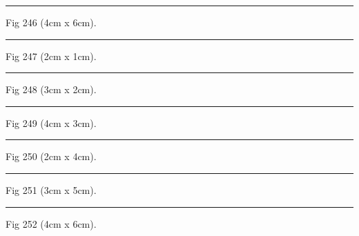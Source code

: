 \documentclass[a4paper,11pt]{article}
\begin{document}
\begin{swarmwrap}%
  \begin{minipage}[t]{4cm}
    \centering
    \rule{\linewidth}{6cm}
    {\footnotesize Fig 246 (4cm x 6cm).}
  \end{minipage}%
\end{swarmwrap}%
\swarmwrapnext
\lipsum[96]%

\begin{swarmwrap}%
  \begin{minipage}[t]{2cm}
    \centering
    \rule{\linewidth}{1cm}
    {\footnotesize Fig 247 (2cm x 1cm).}
  \end{minipage}%
\end{swarmwrap}%
\swarmwrapnext
\lipsum[97]%

\begin{swarmwrap}%
  \begin{minipage}[t]{3cm}
    \centering
    \rule{\linewidth}{2cm}
    {\footnotesize Fig 248 (3cm x 2cm).}
  \end{minipage}%
\end{swarmwrap}%
\swarmwrapnext
\lipsum[98]%

\begin{swarmwrap}%
  \begin{minipage}[t]{4cm}
    \centering
    \rule{\linewidth}{3cm}
    {\footnotesize Fig 249 (4cm x 3cm).}
  \end{minipage}%
\end{swarmwrap}%
\swarmwrapnext
\lipsum[99]%

\begin{swarmwrap}%
  \begin{minipage}[t]{2cm}
    \centering
    \rule{\linewidth}{4cm}
    {\footnotesize Fig 250 (2cm x 4cm).}
  \end{minipage}%
\end{swarmwrap}%
\swarmwrapnext
\lipsum[100]%

\begin{swarmwrap}%
  \begin{minipage}[t]{3cm}
    \centering
    \rule{\linewidth}{5cm}
    {\footnotesize Fig 251 (3cm x 5cm).}
  \end{minipage}%
\end{swarmwrap}%
\swarmwrapnext
\lipsum[101]%

\begin{swarmwrap}%
  \begin{minipage}[t]{4cm}
    \centering
    \rule{\linewidth}{6cm}
    {\footnotesize Fig 252 (4cm x 6cm).}
  \end{minipage}%
\end{swarmwrap}%
\swarmwrapnext
\lipsum[102]%
\end{document}
